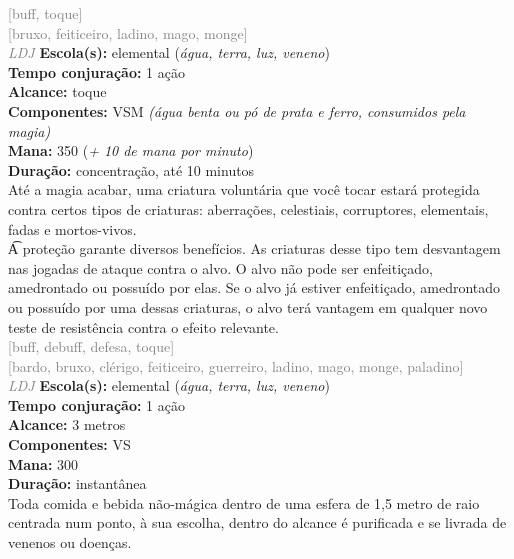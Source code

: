 \documentclass{RPG_Adventure}[2021/10/20]
\begin{document}
{\scriptsize \textcolor{gray}{[buff, toque]\\}}
{\scriptsize \textcolor{gray}{[bruxo, feiticeiro, ladino, mago, monge]\\}}
{\tiny \textcolor{gray}{\textit{LDJ}}}\jump{}
{\small \t \textbf{Escola(s):} elemental (\textit{água, terra, luz, veneno})\\\t \textbf{Tempo conjuração:} 1 ação\\\t \textbf{Alcance:} toque\\\t \textbf{Componentes:} VSM \textit{(água benta ou pó de prata e ferro, consumidos pela magia)}\\\t \textbf{Mana:} 350 (\textit{+ 10 de mana por minuto})\\\t \textbf{Duração:} concentração, até 10 minutos\\}
{\normalsize Até a magia acabar, uma criatura voluntária que você tocar estará protegida contra certos tipos de criaturas: aberrações, celestiais, corruptores, elementais, fadas e mortos-vivos.\\\t A proteção garante diversos benefícios. As criaturas desse tipo tem desvantagem nas jogadas de ataque contra o alvo. O alvo não pode ser enfeitiçado, amedrontado ou possuído por elas. Se o alvo já estiver enfeitiçado, amedrontado ou possuído por uma dessas criaturas, o alvo terá vantagem em qualquer novo teste de resistência contra o efeito relevante.\\}
{\scriptsize \textcolor{gray}{[buff, debuff, defesa, toque]\\}}
{\scriptsize \textcolor{gray}{[bardo, bruxo, clérigo, feiticeiro, guerreiro, ladino, mago, monge, paladino]\\}}
{\tiny \textcolor{gray}{\textit{LDJ}}}\jump{}
{\small \t \textbf{Escola(s):} elemental (\textit{água, terra, luz, veneno})\\\t \textbf{Tempo conjuração:} 1 ação\\\t \textbf{Alcance:} 3 metros\\\t \textbf{Componentes:} VS\\\t \textbf{Mana:} 300\\\t \textbf{Duração:} instantânea\\}
{\normalsize Toda comida e bebida não-mágica dentro de uma esfera de 1,5 metro de raio centrada num ponto, à sua escolha, dentro do alcance é purificada e se livrada de venenos ou doenças.\\}
\end{document}
